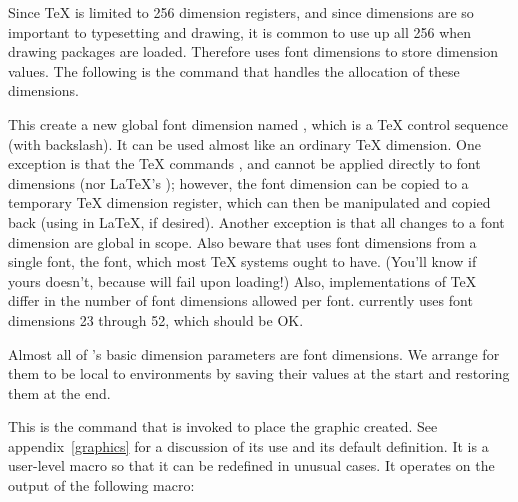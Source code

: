 \documentclass[letterpaper]{article}
\begin{document}
\medskip

Since \TeX{} is limited to 256 dimension registers, and since dimensions
are so important to typesetting and drawing, it is common to use up all
256 when drawing packages are loaded. Therefore \mfp{} uses font
dimensions to store dimension values. The following is the command that
handles the allocation of these dimensions.

\begin{cd}
%
\end{cd}

This create a new global font dimension named , which is a
\TeX{} control sequence (with backslash). It can be used almost like
an ordinary \TeX{} dimension.  One exception is that the \TeX{} commands
,  and  cannot be applied directly
to font dimensions (nor \LaTeX{}'s ); however, the font
dimension can be copied to a temporary \TeX{} dimension register, which
can then be manipulated and copied back (using  in \LaTeX{},
if desired). Another exception is that all changes to a font dimension
are global in scope. Also beware that  uses font dimensions
from a single font, the  font, which most \TeX{} systems
ought to have. (You'll know if yours doesn't, because \mfp{} will fail
upon loading!) Also, implementations of \TeX{} differ in the number of
font dimensions allowed per font. \Mfp{} currently uses font dimensions
23 through 52, which should be OK.

Almost all of \mfp{}'s basic dimension parameters are font dimensions.
We arrange for them to be local to  environments by saving
their values at the start and restoring them at the end.

\begin{cd}
%
\end{cd}

This is the command that is invoked to place the graphic created. See
appendix~\ref{graphics} for a discussion of its use and its default
definition. It is a user-level macro so that it can be redefined in
unusual cases. It operates on the output of the following macro:

\begin{cd}
%
\end{cd}
\end{document}
